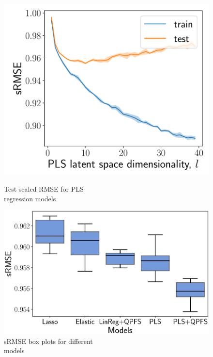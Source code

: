 \documentclass[12pt,twoside]{article}
\theoremstyle{definition}
\begin{document}
\begin{figure}[h]
	\begin{minipage}{.43\linewidth}
		\centering
		\includegraphics[width=1.\linewidth]{figs/pls_vs_k}
		\caption{Test scaled RMSE for PLS \\regression models}
		\label{fig:pls_vs_k}
	\end{minipage}%
	\begin{minipage}{.57\linewidth}
		\centering
		\includegraphics[width=1.\linewidth]{figs/models2}
		\caption{sRMSE box plots for different \\models}
		\label{fig:models}
	\end{minipage}
\end{figure}
\end{document}
